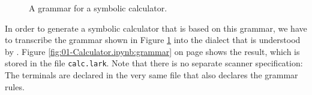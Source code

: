 \begin{figure}[!ht]

  \begin{center}    
  \end{center}
  \caption{A grammar for a symbolic calculator.}
  \label{fig:calculator.g}
\end{figure}

In order to generate a symbolic calculator that is based on this grammar, we have to transcribe the
grammar shown in Figure \ref{fig:calculator.g} into the dialect that is understood by
.  Figure \ref{fig:01-Calculator.ipynb:grammar} on
page \pageref{fig:01-Calculator.ipynb:grammar} shows the result, which is stored in the file
\texttt{calc.lark}.  Note that there is no separate scanner specification:  The terminals are declared in the
very same file that also declares the grammar rules.


